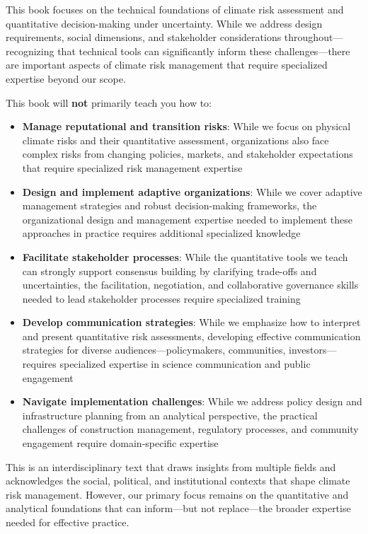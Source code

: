 \documentclass[
  letterpaper,
  DIV=11,
  numbers=noendperiod]{scrreprt}
\providecommand{\tightlist}{%
  \setlength{\itemsep}{0pt}\setlength{\parskip}{0pt}}
\begin{document}

This book focuses on the technical foundations of climate risk
assessment and quantitative decision-making under uncertainty. While we
address design requirements, social dimensions, and stakeholder
considerations throughout---recognizing that technical tools can
significantly inform these challenges---there are important aspects of
climate risk management that require specialized expertise beyond our
scope.

This book will \textbf{not} primarily teach you how to:

\begin{itemize}
\tightlist
\item
  \textbf{Manage reputational and transition risks}: While we focus on
  physical climate risks and their quantitative assessment,
  organizations also face complex risks from changing policies, markets,
  and stakeholder expectations that require specialized risk management
  expertise
\item
  \textbf{Design and implement adaptive organizations}: While we cover
  adaptive management strategies and robust decision-making frameworks,
  the organizational design and management expertise needed to implement
  these approaches in practice requires additional specialized knowledge
\item
  \textbf{Facilitate stakeholder processes}: While the quantitative
  tools we teach can strongly support consensus building by clarifying
  trade-offs and uncertainties, the facilitation, negotiation, and
  collaborative governance skills needed to lead stakeholder processes
  require specialized training
\item
  \textbf{Develop communication strategies}: While we emphasize how to
  interpret and present quantitative risk assessments, developing
  effective communication strategies for diverse
  audiences---policymakers, communities, investors---requires
  specialized expertise in science communication and public engagement
\item
  \textbf{Navigate implementation challenges}: While we address policy
  design and infrastructure planning from an analytical perspective, the
  practical challenges of construction management, regulatory processes,
  and community engagement require domain-specific expertise
\end{itemize}

This is an interdisciplinary text that draws insights from multiple
fields and acknowledges the social, political, and institutional
contexts that shape climate risk management. However, our primary focus
remains on the quantitative and analytical foundations that can
inform---but not replace---the broader expertise needed for effective
practice.
\end{document}
